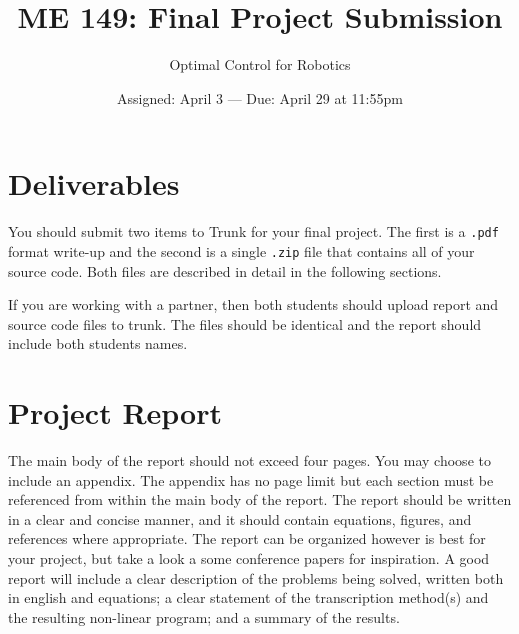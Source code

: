 

\title{ME 149:  Final Project Submission}
\date{Assigned: April 3  ---  Due: April 29 at 11:55pm}
\author{Optimal Control for Robotics}

\maketitle


\section*{Deliverables}

You should submit two items to Trunk for your final project.
The first is a \texttt{.pdf} format write-up and
the second is a single \texttt{.zip} file that contains all of your source code.
Both files are described in detail in the following sections.

\par
If you are working with a partner, then both students should upload report and
source code files to trunk.
The files should be identical and the report should include both students names.


\section*{Project Report}

The main body of the report should not exceed four pages.
You may choose to include an appendix.
The appendix has no page limit but each section must be
referenced from within the main body of the report.
The report should be written in a clear and concise manner, and it should
contain equations, figures, and references where appropriate.
The report can be organized however is best for your project,
but take a look a some conference papers for inspiration.
A good report will include
a clear description of the problems being solved, written both in english and equations;
a clear statement of the transcription method(s) and the resulting non-linear program; and
a summary of the results.


